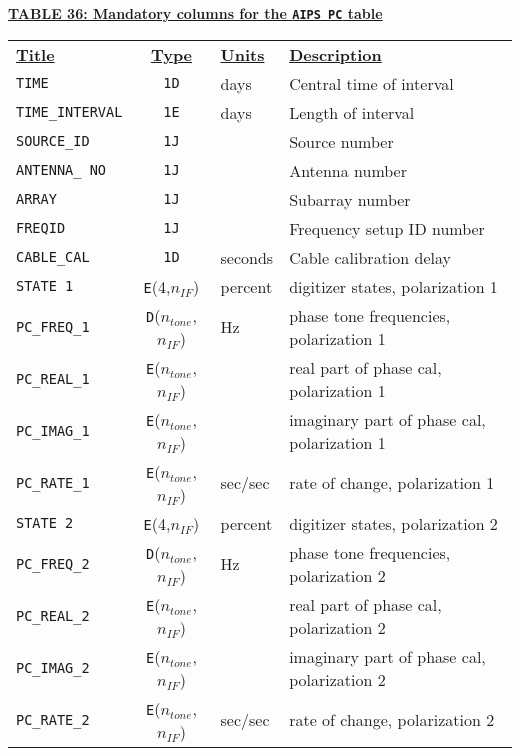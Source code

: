 \documentclass[twoside]{article}
\newcommand{\nif}{$n_{IF}$}
\newcommand{\ntone}{$n_{tone}$}
\begin{document}
\begin{center}
\underline{\bf{TABLE 36: Mandatory columns for the {\tt AIPS PC} table}}\\
\begin{tabular}{lcll}
\noalign{\vspace{2pt}} \label{ta:PCcols}
\underline{{\bf Title\vphantom{y}}} & \underline{\bf{Type}} &
   \underline{{\bf Units\vphantom{y}}} & \underline{\bf{Description}} \\
\noalign{\vspace{2pt}}
{\tt TIME}           & {\tt 1D} & days & Central time of interval \\
{\tt TIME\_INTERVAL} & {\tt 1E} & days & Length of interval \\
{\tt SOURCE\_ID}     & {\tt 1J} &      & Source number \\
{\tt ANTENNA\_ NO}   & {\tt 1J} &      & Antenna number \\
{\tt ARRAY}          & {\tt 1J} &      & Subarray number \\
{\tt FREQID}         & {\tt 1J} &      & Frequency setup ID number \\
{\tt CABLE\_CAL}     & {\tt 1D} & seconds & Cable calibration delay \\
{\tt STATE 1}        & {\tt E}(4,\nif) & percent  & digitizer states, polarization 1 \\
{\tt PC\_FREQ\_1}    & {\tt D}(\ntone,\nif) & Hz & phase tone frequencies, polarization 1 \\
{\tt PC\_REAL\_1}    & {\tt E}(\ntone,\nif) & & real part of phase cal, polarization 1 \\
{\tt PC\_IMAG\_1}    & {\tt E}(\ntone,\nif) & & imaginary part of phase cal, polarization 1 \\
{\tt PC\_RATE\_1}    & {\tt E}(\ntone,\nif) & sec/sec & rate of change, polarization 1 \\
\hline
{\tt STATE 2}        & {\tt E}(4,\nif) & percent & digitizer states, polarization 2 \\
{\tt PC\_FREQ\_2}    & {\tt D}(\ntone,\nif) & Hz & phase tone frequencies, polarization 2 \\
{\tt PC\_REAL\_2}    & {\tt E}(\ntone,\nif) & & real part of phase cal, polarization 2 \\
{\tt PC\_IMAG\_2}    & {\tt E}(\ntone,\nif) & & imaginary part of phase cal, polarization 2 \\
{\tt PC\_RATE\_2}    & {\tt E}(\ntone,\nif) & sec/sec & rate of change, polarization 2
\end{tabular}
\end{center}
\end{document}
